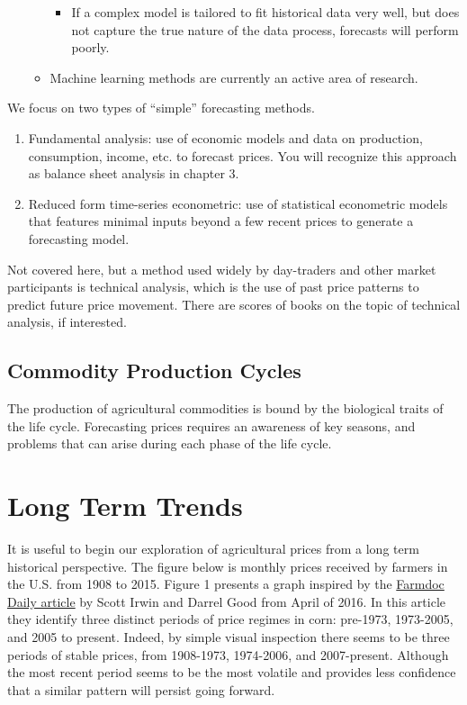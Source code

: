\documentclass[
  letterpaper,
  DIV=11,
  numbers=noendperiod]{scrreprt}
\providecommand{\tightlist}{%
  \setlength{\itemsep}{0pt}\setlength{\parskip}{0pt}}\usepackage{longtable,booktabs,array}
\begin{document}
\begin{enumerate}
\begin{itemize}
    \begin{itemize}
    \tightlist
    \item
      If a complex model is tailored to fit historical data very well,
      but does not capture the true nature of the data process,
      forecasts will perform poorly.
    \end{itemize}
  \item
    Machine learning methods are currently an active area of research.
  \end{itemize}
\end{enumerate}

We focus on two types of ``simple'' forecasting methods.

\begin{enumerate}
\def\labelenumi{\arabic{enumi}.}
\item
  Fundamental analysis: use of economic models and data on production,
  consumption, income, etc. to forecast prices. You will recognize this
  approach as balance sheet analysis in chapter 3.
\item
  Reduced form time-series econometric: use of statistical econometric
  models that features minimal inputs beyond a few recent prices to
  generate a forecasting model.
\end{enumerate}

Not covered here, but a method used widely by day-traders and other
market participants is technical analysis, which is the use of past
price patterns to predict future price movement. There are scores of
books on the topic of technical analysis, if interested.

\subsection{Commodity Production
Cycles}\label{commodity-production-cycles}

The production of agricultural commodities is bound by the biological
traits of the life cycle. Forecasting prices requires an awareness of
key seasons, and problems that can arise during each phase of the life
cycle.

\section{Long Term Trends}\label{long-term-trends}

It is useful to begin our exploration of agricultural prices from a long
term historical perspective. The figure below is monthly prices received
by farmers in the U.S. from 1908 to 2015. Figure 1 presents a graph
inspired by the
\href{http://farmdocdaily.illinois.edu/2016/04/new-era-of-corn-and-soybean-prices.html}{Farmdoc
Daily article} by Scott Irwin and Darrel Good from April of 2016. In
this article they identify three distinct periods of price regimes in
corn: pre-1973, 1973-2005, and 2005 to present. Indeed, by simple visual
inspection there seems to be three periods of stable prices, from
1908-1973, 1974-2006, and 2007-present. Although the most recent period
seems to be the most volatile and provides less confidence that a
similar pattern will persist going forward.
\end{document}
